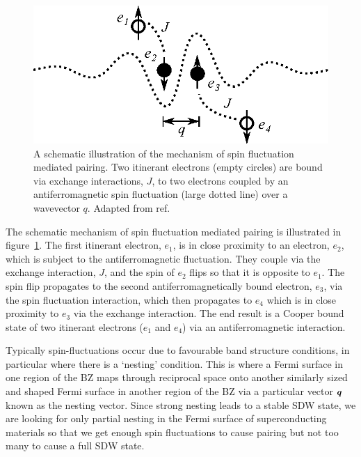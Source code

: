 \begin{figure}[htbp]
    \begin{center}
        \includegraphics[scale=0.8]{Chapter-Introduction/Figures/SpinFluctuationPairing/SpinFluctuationPairing}
        \caption{A schematic illustration of the mechanism of spin fluctuation mediated pairing. Two itinerant electrons (empty circles) are bound via exchange interactions, $J$, to two electrons coupled by an antiferromagnetic spin fluctuation (large dotted line) over a wavevector $q$. Adapted from ref.~\cite{Cox1995}}
        \label{Fig:Intro:SpinFluctuationPairing}
    \end{center}
\end{figure}

The schematic mechanism of spin fluctuation mediated pairing is illustrated in figure~\ref{Fig:Intro:SpinFluctuationPairing}. The first itinerant electron, $e_1$, is in close proximity to an electron, $e_2$, which is subject to the antiferromagnetic fluctuation. They couple via the exchange interaction, $J$, and the spin of $e_2$ flips so that it is opposite to $e_1$. The spin flip propagates to the second antiferromagnetically bound electron, $e_3$, via the spin fluctuation interaction, which then propagates to $e_4$ which is in close proximity to $e_3$ via the exchange interaction. The end result is a Cooper bound state of two itinerant electrons ($e_1$ and $e_4$) via an antiferromagnetic interaction.

Typically spin-fluctuations occur due to favourable band structure conditions, in particular where there is a `nesting' condition. This is where a Fermi surface in one region of the \ac{BZ} maps through reciprocal space onto another similarly sized and shaped Fermi surface in another region of the \ac{BZ} via a particular vector $\boldsymbol{q}$ known as the nesting vector. Since strong nesting leads to a stable \ac{SDW} state, we are looking for only partial nesting in the Fermi surface of superconducting materials so that we get enough spin fluctuations to cause pairing but not too many to cause a full \ac{SDW} state.

